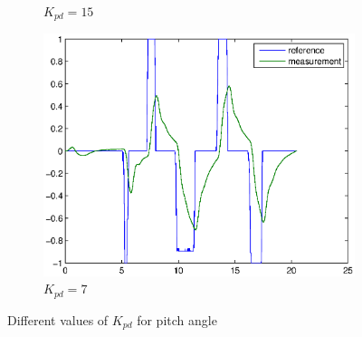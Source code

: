 \begin{figure}[H]
\begin{subfigure}{0.5\textwidth}
    \caption{$K_{pd}= 15$}
\end{subfigure}
\begin{subfigure}{0.5\textwidth}
    \includegraphics[width=0.9\linewidth]{Part2_pictures/p2p1/Kpd7pitch.eps}
    \caption{$K_{pd}= 7$}
\end{subfigure}
\caption{Different values of $K_{pd}$ for pitch angle}
\end{figure}

